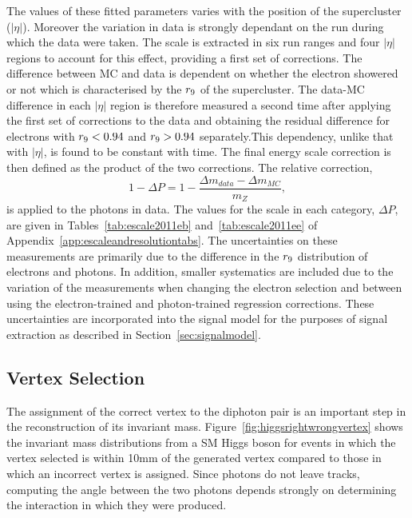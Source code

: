 The values of these fitted parameters varies with the position of the supercluster ($|\eta|$). Moreover the
variation in data is strongly dependant on the run during which the data were taken. The scale is extracted in 
six run ranges and four $|\eta|$ regions to account for this effect, providing a first set of corrections. 
The difference between MC and data is dependent on whether the electron showered or not which 
is characterised by the $r_{9}$ of the supercluster. 
The data-MC difference in each $|\eta|$ region is therefore measured
a second time after applying the first set of corrections to the data and obtaining the residual difference
for electrons with $r_{9}<0.94$ and $r_{9}>0.94$ separately.This dependency, 
unlike that with $|\eta|$, is found to be constant with time. The final energy scale correction is then defined
as the product of the two corrections. The relative correction, 
\begin{equation}
1-\Delta P = 1 - \frac {\displaystyle \Delta m_{data} - \Delta m_{MC} }{\displaystyle m_{Z} },
\end{equation}
is applied to the photons in data. The values for the scale in each category, $\Delta P$, are given in 
Tables~\ref{tab:escale2011eb} and~\ref{tab:escale2011ee} of Appendix~\ref{app:escaleandresolutiontabs}. 
The uncertainties on these measurements are primarily due to 
the difference in the $r_{9}$ distribution of electrons and photons. In addition, smaller systematics
are included due to the variation of the measurements when changing the electron selection and
between using the electron-trained and photon-trained regression corrections.
These uncertainties are incorporated into the signal model for the purposes of 
signal extraction as described in Section~\ref{sec:signalmodel}.

\subsection{Vertex Selection}
\label{sec:vertexselection}

The assignment of the correct vertex to the diphoton pair is an important step in the reconstruction of 
its invariant mass. Figure~\ref{fig:higgsrightwrongvertex} shows the invariant mass distributions from a SM
Higgs boson for events in which the vertex selected is within 10mm of the generated vertex
compared to those in which an incorrect vertex is assigned. 
Since photons do not leave tracks, computing the angle between the two photons 
depends strongly on determining the interaction in which they were produced.


